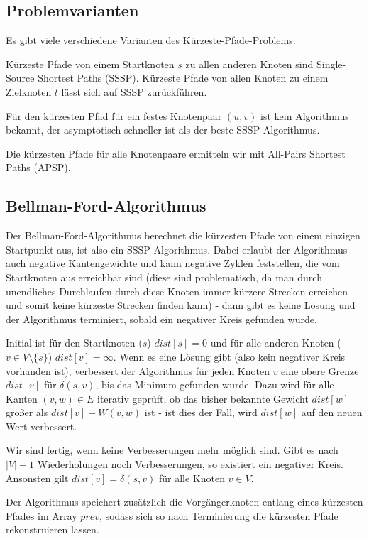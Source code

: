 \documentclass[12pt]{article}
\begin{document}
\subsection{Problemvarianten}

Es gibt viele verschiedene Varianten des Kürzeste-Pfade-Problems:

Kürzeste Pfade von einem Startknoten $s$ zu allen anderen Knoten sind Single-Source Shortest Paths (SSSP). Kürzeste Pfade von allen Knoten zu einem Zielknoten $t$ lässt sich auf SSSP zurückführen.

Für den kürzesten Pfad für ein festes Knotenpaar $(u, v)$ ist kein Algorithmus bekannt, der asymptotisch schneller ist als der beste SSSP-Algorithmus.

Die kürzesten Pfade für alle Knotenpaare ermitteln wir mit All-Pairs Shortest Paths (APSP).

\subsection{Bellman-Ford-Algorithmus}

Der Bellman-Ford-Algorithmus berechnet die kürzesten Pfade von einem einzigen Startpunkt aus, ist also ein SSSP-Algorithmus. Dabei erlaubt der Algorithmus auch negative Kantengewichte und kann negative Zyklen feststellen, die vom Startknoten aus erreichbar sind (diese sind problematisch, da man durch unendliches Durchlaufen durch diese Knoten immer kürzere Strecken erreichen und somit keine kürzeste Strecken finden kann) - dann gibt es keine Lösung und der Algorithmus terminiert, sobald ein negativer Kreis gefunden wurde.

Initial ist für den Startknoten ($s$) $dist[s] = 0$ und für alle anderen Knoten ($v \in V \setminus \{s\}$) $dist[v] = \infty$. Wenn es eine Lösung gibt (also kein negativer Kreis vorhanden ist), verbessert der Algorithmus für jeden Knoten $v$ eine obere Grenze $dist[v]$ für $\delta(s, v)$, bis das Minimum gefunden wurde. Dazu wird für alle Kanten $(v, w) \in E$ iterativ geprüft, ob das bisher bekannte Gewicht $dist[w]$ größer als $dist[v] + W(v, w)$ ist - ist dies der Fall, wird $dist[w]$ auf den neuen Wert verbessert.

Wir sind fertig, wenn keine Verbesserungen mehr möglich sind. Gibt es nach $|V|-1$ Wiederholungen noch Verbesserungen, so existiert ein negativer Kreis. Ansonsten gilt $dist[v] = \delta(s, v)$ für alle Knoten $v \in V$.

Der Algorithmus speichert zusätzlich die Vorgängerknoten entlang eines kürzesten Pfades im Array $prev$, sodass sich so nach Terminierung die kürzesten Pfade rekonstruieren lassen.
\end{document}
